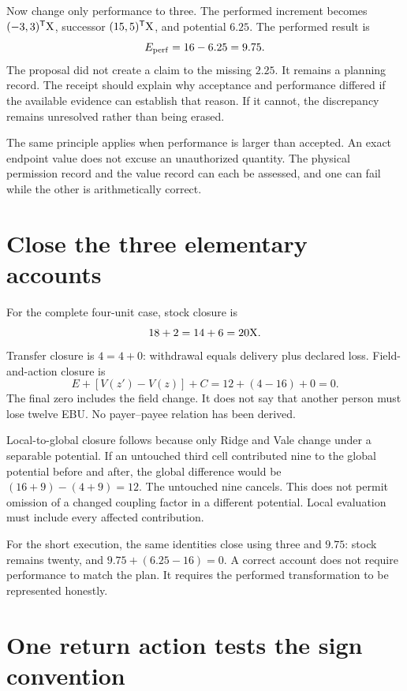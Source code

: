 Now change only performance to three. The performed increment becomes \((-3,3)^{\mathsf T}\mathrm{X}\), successor \((15,5)^{\mathsf T}\mathrm{X}\), and potential \(6.25\). The performed result is
\begin{equation}
E_{\rm perf}=16-6.25=9.75.
\end{equation}
The proposal did not create a claim to the missing \(2.25\). It remains a planning record. The receipt should explain why acceptance and performance differed if the available evidence can establish that reason. If it cannot, the discrepancy remains unresolved rather than being erased.

The same principle applies when performance is larger than accepted. An exact endpoint value does not excuse an unauthorized quantity. The physical permission record and the value record can each be assessed, and one can fail while the other is arithmetically correct.

\section{Close the three elementary accounts}

For the complete four-unit case, stock closure is
\begin{equation}
18+2=14+6=20\mathrm{X}.
\end{equation}
Transfer closure is \(4=4+0\): withdrawal equals delivery plus declared loss. Field-and-action closure is
\begin{equation}
E+[V(z')-V(z)]+C=12+(4-16)+0=0.
\end{equation}
The final zero includes the field change. It does not say that another person must lose twelve EBU. No payer--payee relation has been derived.

Local-to-global closure follows because only Ridge and Vale change under a separable potential. If an untouched third cell contributed nine to the global potential before and after, the global difference would be \((16+9)-(4+9)=12\). The untouched nine cancels. This does not permit omission of a changed coupling factor in a different potential. Local evaluation must include every affected contribution.

For the short execution, the same identities close using three and \(9.75\): stock remains twenty, and \(9.75+(6.25-16)=0\). A correct account does not require performance to match the plan. It requires the performed transformation to be represented honestly.

\section{One return action tests the sign convention}

